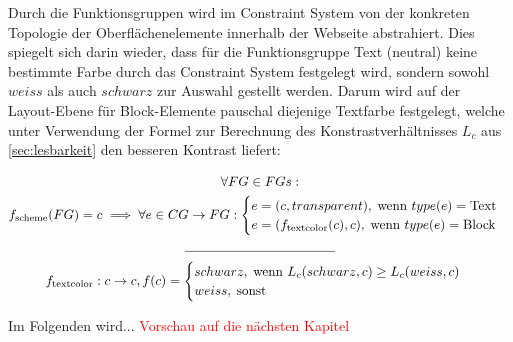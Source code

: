 Durch die Funktionsgruppen wird im Constraint System von der konkreten Topologie der Oberflächenelemente innerhalb der Webseite abstrahiert. Dies spiegelt sich darin wieder, dass für die Funktionsgruppe \glqq{}Text (neutral)\grqq{} keine bestimmte Farbe durch das Constraint System festgelegt wird, sondern sowohl $weiss$ als auch $schwarz$ zur Auswahl gestellt werden. Darum wird auf der Layout-Ebene für Block-Elemente pauschal diejenige Textfarbe festgelegt, welche unter Verwendung der Formel zur Berechnung des Konstrastverhältnisses $L_c$ aus \autoref{sec:lesbarkeit} den besseren Kontrast liefert:


\begin{equation}
\begin{gathered}
	    \forall FG \in FGs:\\
	    f_\text{scheme}(FG) = c \implies \forall e \in CG \to FG:
  	\begin{cases}
		e = (c, transparent),\; \text{wenn } type(e) = \text{Text} \\
		e = (f_\text{textcolor}(c), c), \; \text{wenn } type(e) = \text{Block}
	\end{cases}\\
	  \mathclap{\rule{4cm}{0.4pt}}\\
 	f_\text{textcolor}: c \to c, f(c) =
  		   	\begin{cases}
  		   		schwarz,\; \text{wenn } L_c(schwarz, c) \geq L_c(weiss, c) \\
		weiss,\; \text{sonst} \\
	\end{cases}
\end{gathered}
\end{equation}

Im Folgenden wird...
\textcolor{red}{Vorschau auf die nächsten Kapitel}

  

